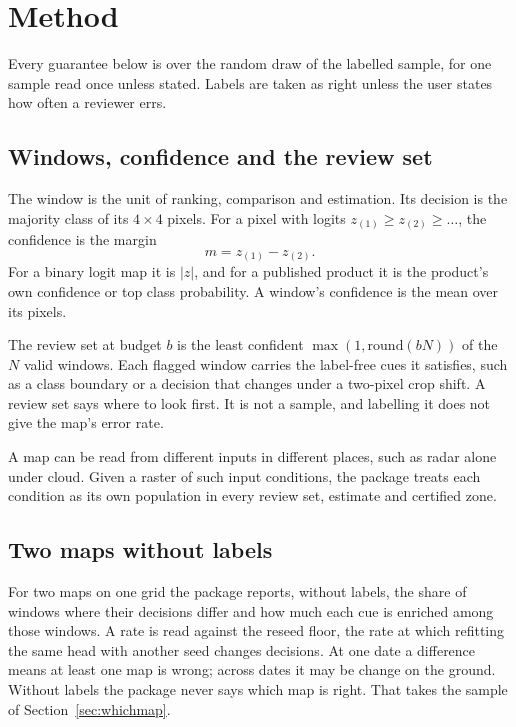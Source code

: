 \documentclass[11pt,a4paper]{article}
\begin{document}
\section{Method}
\label{sec:methods}

Every guarantee below is over the random draw of the labelled sample, for one sample read once unless stated. Labels
are taken as right unless the user states how often a reviewer errs.

\subsection{Windows, confidence and the review set}
\label{sec:ranking}

The window is the unit of ranking, comparison and estimation. Its decision is the majority class of its $4\times4$
pixels. For a pixel with logits $z_{(1)} \ge z_{(2)} \ge \dots$, the confidence is the margin
\begin{equation}
  m = z_{(1)} - z_{(2)}.
\end{equation}
For a binary logit map it is $|z|$, and for a published product it is the product's own confidence or top class
probability. A window's confidence is the mean over its pixels.

The review set at budget $b$ is the least confident $\max(1, \mathrm{round}(bN))$ of the $N$ valid windows. Each
flagged window carries the label-free cues it satisfies, such as a class boundary or a decision that changes under a
two-pixel crop shift. A review set says where to look first. It is not a sample, and labelling it does not give the
map's error rate.

A map can be read from different inputs in different places, such as radar alone under cloud. Given a raster of such
input conditions, the package treats each condition as its own population in every review set, estimate and
certified zone.

\subsection{Two maps without labels}
\label{sec:compare}

For two maps on one grid the package reports, without labels, the share of windows where their decisions differ and
how much each cue is enriched among those windows. A rate is read against the reseed floor, the rate at which
refitting the same head with another seed changes decisions. At one date a difference means at least one map is
wrong; across dates it may be change on the ground. Without labels the package never says which map is right. That
takes the sample of Section~\ref{sec:whichmap}.
\end{document}
